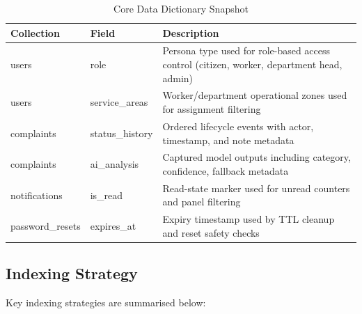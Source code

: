 \begin{table}[H]
\centering
\begin{tabularx}{\textwidth}{|>{\RaggedRight\arraybackslash}p{}|>{\RaggedRight\arraybackslash}p{}|>{\RaggedRight\arraybackslash}X|}
\hline
\textbf{Collection} & \textbf{Field} & \textbf{Description} \\ \hline
users & role & Persona type used for role-based access control (citizen, worker, department head, admin) \\ \hline
users & service\_areas & Worker/department operational zones used for assignment filtering \\ \hline
complaints & status\_history & Ordered lifecycle events with actor, timestamp, and note metadata \\ \hline
complaints & ai\_analysis & Captured model outputs including category, confidence, fallback metadata \\ \hline
notifications & is\_read & Read-state marker used for unread counters and panel filtering \\ \hline
password\_resets & expires\_at & Expiry timestamp used by TTL cleanup and reset safety checks \\ \hline
\end{tabularx}
\captionsetup{position=bottom}
\caption{Core Data Dictionary Snapshot}
\label{tab:data-dictionary}
\end{table}

\subsection{Indexing Strategy}

Key indexing strategies are summarised below:

